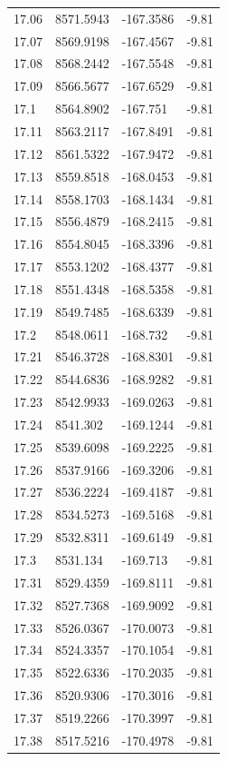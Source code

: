 \begin{table}[H]
\begin{tabular}{llll}
17.06 & 8571.5943 & -167.3586 & -9.81 \\
17.07 & 8569.9198 & -167.4567 & -9.81 \\
17.08 & 8568.2442 & -167.5548 & -9.81 \\
17.09 & 8566.5677 & -167.6529 & -9.81 \\
17.1 & 8564.8902 & -167.751 & -9.81 \\
17.11 & 8563.2117 & -167.8491 & -9.81 \\
17.12 & 8561.5322 & -167.9472 & -9.81 \\
17.13 & 8559.8518 & -168.0453 & -9.81 \\
17.14 & 8558.1703 & -168.1434 & -9.81 \\
17.15 & 8556.4879 & -168.2415 & -9.81 \\
17.16 & 8554.8045 & -168.3396 & -9.81 \\
17.17 & 8553.1202 & -168.4377 & -9.81 \\
17.18 & 8551.4348 & -168.5358 & -9.81 \\
17.19 & 8549.7485 & -168.6339 & -9.81 \\
17.2 & 8548.0611 & -168.732 & -9.81 \\
17.21 & 8546.3728 & -168.8301 & -9.81 \\
17.22 & 8544.6836 & -168.9282 & -9.81 \\
17.23 & 8542.9933 & -169.0263 & -9.81 \\
17.24 & 8541.302 & -169.1244 & -9.81 \\
17.25 & 8539.6098 & -169.2225 & -9.81 \\
17.26 & 8537.9166 & -169.3206 & -9.81 \\
17.27 & 8536.2224 & -169.4187 & -9.81 \\
17.28 & 8534.5273 & -169.5168 & -9.81 \\
17.29 & 8532.8311 & -169.6149 & -9.81 \\
17.3 & 8531.134 & -169.713 & -9.81 \\
17.31 & 8529.4359 & -169.8111 & -9.81 \\
17.32 & 8527.7368 & -169.9092 & -9.81 \\
17.33 & 8526.0367 & -170.0073 & -9.81 \\
17.34 & 8524.3357 & -170.1054 & -9.81 \\
17.35 & 8522.6336 & -170.2035 & -9.81 \\
17.36 & 8520.9306 & -170.3016 & -9.81 \\
17.37 & 8519.2266 & -170.3997 & -9.81 \\
17.38 & 8517.5216 & -170.4978 & -9.81 \\

\end{tabular}
\end{table}
